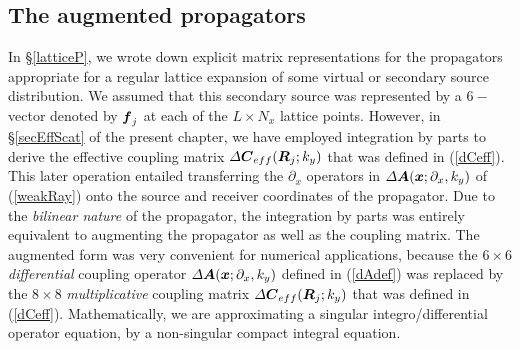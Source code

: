 \subsection{The augmented propagators }
In \S\ref{latticeP},  we wrote down explicit matrix representations for the 
propagators appropriate for a regular lattice expansion of some virtual 
or secondary source distribution. We assumed that this secondary source 
was represented by a $6-$vector denoted by ${\mbox{\boldmath$\mit f$\unboldmath}}_j$ at each of the $L 
\times N_x$ lattice points. However,  in \S\ref{secEffScat} of the present 
chapter, we have employed integration by parts to derive the effective 
coupling matrix ${\mit \Delta}{\mbox{\boldmath$\mit C$\unboldmath}}{}_{eff}({\mbox{\boldmath$\mit R$\unboldmath}}_j;k_y)$ that was defined in (\ref{dCeff}). This later operation 
entailed transferring the $\partial_x$ operators in ${{\mit \Delta} {\mbox{\boldmath$\mit A$\unboldmath}}}({\mbox{\boldmath$\mit x$\unboldmath}};{\partial 
}_{x},{k}_{y})$ of (\ref{weakRay}) onto 
the source and receiver coordinates of the propagator. Due to the {\em 
bilinear nature\/} of the propagator, the integration by parts was 
entirely equivalent to augmenting the propagator as well as the coupling 
matrix. The augmented form was very convenient for numerical 
applications, because the $6 \times 6 $ {\em differential\/} coupling operator 
${{\mit \Delta} {\mbox{\boldmath$\mit A$\unboldmath}}}({\mbox{\boldmath$\mit x$\unboldmath}};{\partial 
}_{x},{k}_{y})$ defined in (\ref{dAdef}) was replaced by the $8 \times 8$ 
{\em multiplicative\/} coupling matrix ${\mit \Delta}{\mbox{\boldmath$\mit C$\unboldmath}}{}_{eff}({\mbox{\boldmath$\mit R$\unboldmath}}_j;k_y)$ that was defined in (\ref{dCeff}). Mathematically, we are 
approximating a singular integro/differential operator equation, by a 
non-singular compact integral equation. 

